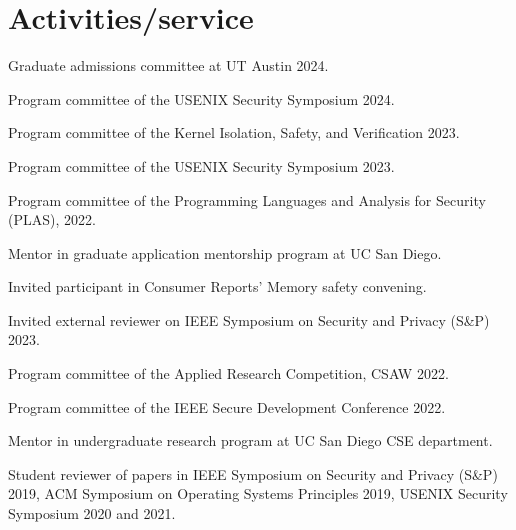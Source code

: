 \section{Activities/service}

{ Graduate admissions committee at UT Austin 2024. }

{ Program committee of the USENIX Security Symposium 2024. }

{ Program committee of the Kernel Isolation, Safety, and Verification 2023. }

{ Program committee of the USENIX Security Symposium 2023. }

{ Program committee of the Programming Languages and Analysis for Security (PLAS), 2022. }

{ Mentor in 
graduate application mentorship program at UC San Diego. }

{ Invited participant in Consumer Reports' Memory safety convening. }

{ Invited external reviewer on IEEE Symposium on Security and Privacy (S\&P) 2023.}

{ Program committee of the Applied Research Competition, CSAW 2022. }

{ Program committee of the IEEE Secure Development Conference 2022. }

{ Mentor in  undergraduate research program at UC San Diego CSE department. }

{ Student reviewer of papers in IEEE Symposium on Security and Privacy (S\&P)
2019, ACM Symposium on Operating Systems Principles 2019, USENIX Security
Symposium 2020 and 2021. }
